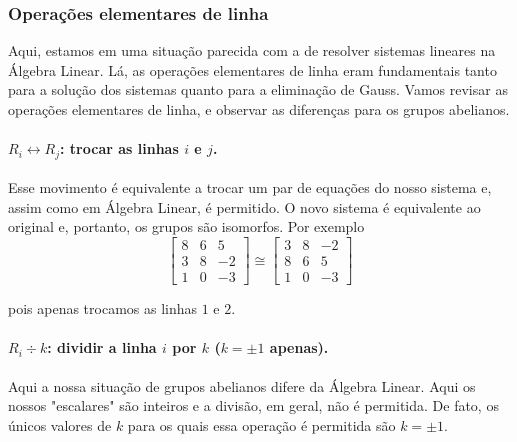 \documentclass[a4paper,portuguese,11pt,twoside, leqno]{book}
\theoremstyle{definition}
\begin{document}
	\subsubsection{Operações elementares de linha}
	\hspace{12pt} Aqui, estamos em uma situação parecida com a de resolver sistemas lineares na Álgebra Linear. Lá, as operações elementares de linha eram fundamentais tanto para a solução dos sistemas quanto para a eliminação de Gauss. Vamos revisar as operações elementares de linha, e observar as diferenças para os grupos abelianos.
	\paragraph{$R_i\leftrightarrow R_j$: trocar as linhas $i$ e $j$.} Esse movimento é equivalente a trocar um par de equações do nosso sistema e, assim como em Álgebra Linear, é permitido. O novo sistema é equivalente ao original e, portanto, os grupos são isomorfos. Por exemplo
	$$
	\begin{bmatrix}
	8 & 6 & 5 \\
	3 & 8 & -2 \\
	1 & 0 & -3
	\end{bmatrix}\cong\begin{bmatrix}
	3 & 8 & -2 \\
	8 & 6 & 5 \\
	1 & 0 & -3
	\end{bmatrix}
	$$
	\par\vspace{0.3cm} pois apenas trocamos as linhas $1$ e $2$.
	\paragraph{$R_i \div k$: dividir a linha $i$ por $k$ ($k=\pm1$ apenas).} Aqui a nossa situação de grupos abelianos difere da Álgebra Linear. Aqui os nossos "escalares" são inteiros e a divisão, em geral, não é permitida. De fato, os únicos valores de $k$ para os quais essa operação é permitida são $k=\pm1$.
	
\end{document}
